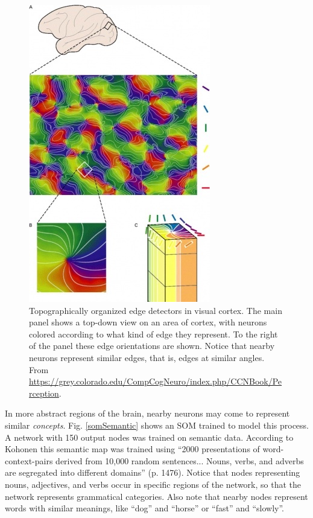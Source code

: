 \begin{figure}[h]
\centering
\includegraphics[scale=.6]{./images/edgeDetectorsCortex.jpg}
\caption[From \url{https://grey.colorado.edu/CompCogNeuro/index.php/File:fig_v1_orientation_cols_data.jpg}.]{Topographically organized edge detectors in visual cortex. The main panel shows a top-down view on an area of cortex, with neurons colored according to what kind of edge they represent. To the right of the panel these edge orientations are shown. Notice that nearby neurons represent similar edges, that is, edges at similar angles. From  \url{https://grey.colorado.edu/CompCogNeuro/index.php/CCNBook/Perception}.}
\label{edgeDetectors}
\end{figure}

In more abstract regions of the brain, nearby neurons may come to represent similar \emph{concepts}. Fig. \ref{somSemantic} shows an SOM trained to model this process. A network with 150 output nodes was trained on semantic data. According to Kohonen this semantic map was trained using ``2000 presentations of word-context-pairs derived from 10,000 random sentences... Nouns, verbs, and adverbs are segregated into different domains'' (p. 1476)\cite{kohonen1990self}. Notice that nodes representing nouns, adjectives, and verbs occur in specific regions of the network, so that the network represents grammatical categories. Also note that nearby nodes represent words with similar meanings, like ``dog'' and ``horse'' or ``fast'' and ``slowly''.

